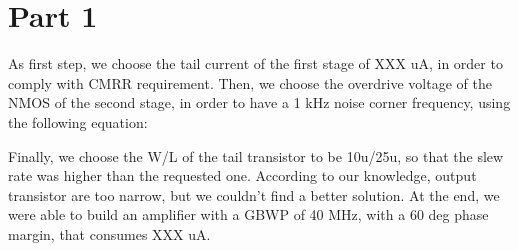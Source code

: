 \chapter{Part 1} %
\label{cha:part_1}

As first step, we choose the tail current of the first stage of XXX uA, in order to comply with CMRR requirement.
Then, we choose the overdrive voltage of the NMOS of the second stage, in order to have a 1 kHz noise corner frequency, using the following equation:



Finally, we choose the W/L of the tail transistor to be 10u/25u, so that the slew rate was higher than the requested one.
According to our knowledge, output transistor are too narrow, but we couldn’t find a better solution.
At the end, we were able to build an amplifier with a GBWP of 40 MHz, with a 60 deg phase margin, that consumes XXX uA.


